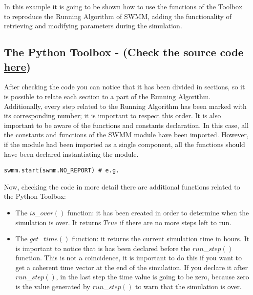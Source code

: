 \documentclass[11pt, letterpaper]{article}
\begin{document}
\setlength\parindent{12pt}
In this example it is going to be shown how to use the functions of the Toolbox to reproduce the Running Algorithm of SWMM, adding the functionality of retrieving and modifying parameters during the simulation.

\subsection{The Python Toolbox - (Check the source code \textcolor{blue}{\href{https://bitbucket.org/swmmtoolbox001/python-module}{here}})}
\begin{center}
\begin{framed}

\end{framed}
\end{center}

\setlength\parindent{0pt}

After checking the code you can notice that it has been divided in sections, so it is possible to relate each section to a part of the Running Algorithm. Additionally, every step related to the Running Algorithm has been marked with its corresponding number; it is important to respect this order. It is also important to be aware of the functions and constants declaration. In this case, all the constants and functions of the SWMM module have been imported. However, if the module had been imported as a single component, all the functions should have been declared instantiating the module. \\
\begin{center}
\begin{lstlisting}
swmm.start(swmm.NO_REPORT) # e.g.
\end{lstlisting}
\end{center}

\setlength\parindent{12pt}
Now, checking the code in more detail there are additional functions related to the Python Toolbox:
\newline

\begin{itemize}
	\item The $is$\_$over()$ function: it has been created in order to determine when the simulation is over. It returns $True$ if there are no more steps left to run. 
	\item The $get$\_$time()$ function: it returns the current simulation time in hours. It is important to notice that is has been declared before the $run$\_$step()$ function. This is not a coincidence, it is important to do this if you want to get a coherent time vector at the end of the simulation. If you declare it after $run$\_$step()$, in the last step the time value is going to be zero, because zero is the value generated by $run$\_$step()$ to warn that the simulation is over.
\end{itemize}
\end{document}
